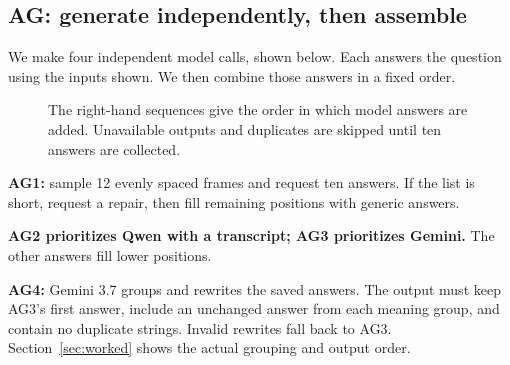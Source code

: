 \documentclass[11pt,letterpaper]{article}
\begin{document}
\subsection{AG: generate independently, then assemble}
We make four independent model calls, shown below. Each answers the question using the inputs shown. We then combine those answers in a fixed order.
\begin{figure}[H]\centering
{}
\caption{The right-hand sequences give the order in which model answers are added. Unavailable outputs and duplicates are skipped until ten answers are collected.}\label{fig:ag}
\end{figure}
\textbf{AG1:} sample 12 evenly spaced frames and request ten answers. If the list is short, request a repair, then fill remaining positions with generic answers.\par
\textbf{AG2 prioritizes Qwen with a transcript; AG3 prioritizes Gemini.} The other answers fill lower positions.\par
\textbf{AG4:} Gemini 3.7 groups and rewrites the saved answers. The output must keep AG3's first answer, include an unchanged answer from each meaning group, and contain no duplicate strings. Invalid rewrites fall back to AG3. Section~\ref{sec:worked} shows the actual grouping and output order.
\end{document}
